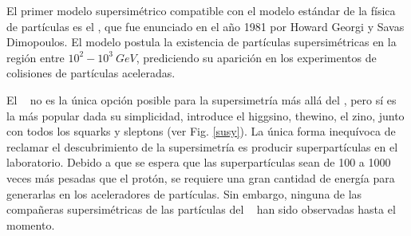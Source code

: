 



El primer modelo supersimétrico compatible con el modelo estándar de la física de partículas es el \MSSM, que fue enunciado en el año 1981 por Howard Georgi y Savas Dimopoulos. El modelo postula la existencia de partículas supersimétricas en la región entre $10^2-10^3~GeV$, prediciendo su aparición en los experimentos de colisiones de partículas aceleradas. %

El \MSSM ~ no es la única opción posible para la supersimetría más allá del \ME, %
pero sí es la más popular dada su simplicidad, introduce el higgsino, thewino, el zino, junto con todos los squarks y sleptons (ver Fig. \ref{susy}). 
La única forma inequívoca de reclamar el descubrimiento de la supersimetría es producir superpartículas en el laboratorio. Debido a que se espera que las superpartículas sean de 100 a 1000 veces más pesadas que el protón, se requiere una gran cantidad de energía para generarlas %
en los aceleradores de partículas. Sin embargo, ninguna de las compañeras supersimétricas de las partículas del \ME ~ han sido observadas hasta el momento.

